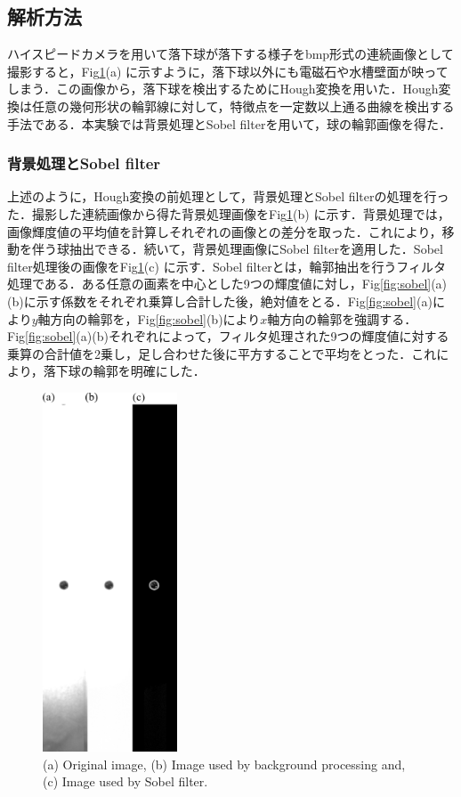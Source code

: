 \subsection{解析方法}
ハイスピードカメラを用いて落下球が落下する様子をbmp形式の連続画像として撮影すると，Fig\ref{fig:expPhoto}(a) に示すように，落下球以外にも電磁石や水槽壁面が映ってしまう．この画像から，落下球を検出するためにHough変換を用いた．Hough変換は任意の幾何形状の輪郭線に対して，特徴点を一定数以上通る曲線を検出する手法である．本実験では背景処理とSobel filterを用いて，球の輪郭画像を得た．
\subsubsection{背景処理とSobel filter}
上述のように，Hough変換の前処理として，背景処理とSobel filterの処理を行った．撮影した連続画像から得た背景処理画像をFig\ref{fig:expPhoto}(b) に示す．背景処理では，画像輝度値の平均値を計算しそれぞれの画像との差分を取った．これにより，移動を伴う球抽出できる．続いて，背景処理画像にSobel filterを適用した．Sobel filter処理後の画像をFig\ref{fig:expPhoto}(c) に示す．Sobel filterとは，輪郭抽出を行うフィルタ処理である．ある任意の画素を中心とした9つの輝度値に対し，Fig\ref{fig:sobel}(a)(b)に示す係数をそれぞれ乗算し合計した後，絶対値をとる．Fig\ref{fig:sobel}(a)により$y$軸方向の輪郭を，Fig\ref{fig:sobel}(b)により$x$軸方向の輪郭を強調する．Fig\ref{fig:sobel}(a)(b)それぞれによって，フィルタ処理された9つの輝度値に対する乗算の合計値を2乗し，足し合わせた後に平方することで平均をとった．これにより，落下球の輪郭を明確にした．

\begin{figure}[h]
    \centering
    \includegraphics[width=4.0cm,clip]{2-Methods/exp-img.png}
    \caption{(a) Original image, (b) Image used by background processing and, (c) Image used by Sobel filter.}
    \label{fig:expPhoto}
\end{figure}

